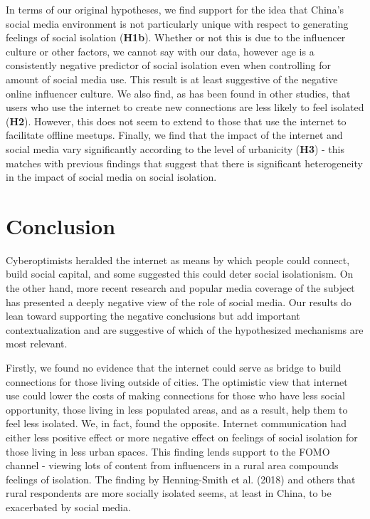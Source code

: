 \documentclass[]{interact}
\theoremstyle{plain}%
\theoremstyle{definition}
\theoremstyle{remark}
\begin{document}
In terms of our original hypotheses, we find support for the idea that
China's social media environment is not particularly unique with respect
to generating feelings of social isolation (\textbf{H1b}). Whether or
not this is due to the influencer culture or other factors, we cannot
say with our data, however age is a consistently negative predictor of
social isolation even when controlling for amount of social media use.
This result is at least suggestive of the negative online influencer
culture. We also find, as has been found in other studies, that users
who use the internet to create new connections are less likely to feel
isolated (\textbf{H2}). However, this does not seem to extend to those
that use the internet to facilitate offline meetups. Finally, we find
that the impact of the internet and social media vary significantly
according to the level of urbanicity (\textbf{H3}) - this matches with
previous findings that suggest that there is significant heterogeneity
in the impact of social media on social isolation.

\section{Conclusion}\label{conclusion}

Cyberoptimists heralded the internet as means by which people could
connect, build social capital, and some suggested this could deter
social isolationism. On the other hand, more recent research and popular
media coverage of the subject has presented a deeply negative view of
the role of social media. Our results do lean toward supporting the
negative conclusions but add important contextualization and are
suggestive of which of the hypothesized mechanisms are most relevant.

Firstly, we found no evidence that the internet could serve as bridge to
build connections for those living outside of cities. The optimistic
view that internet use could lower the costs of making connections for
those who have less social opportunity, those living in less populated
areas, and as a result, help them to feel less isolated. We, in fact,
found the opposite. Internet communication had either less positive
effect or more negative effect on feelings of social isolation for those
living in less urban spaces. This finding lends support to the FOMO
channel - viewing lots of content from influencers in a rural area
compounds feelings of isolation. The finding by Henning-Smith et al.
(2018) and others that rural respondents are more socially isolated
seems, at least in China, to be exacerbated by social media.
\end{document}
